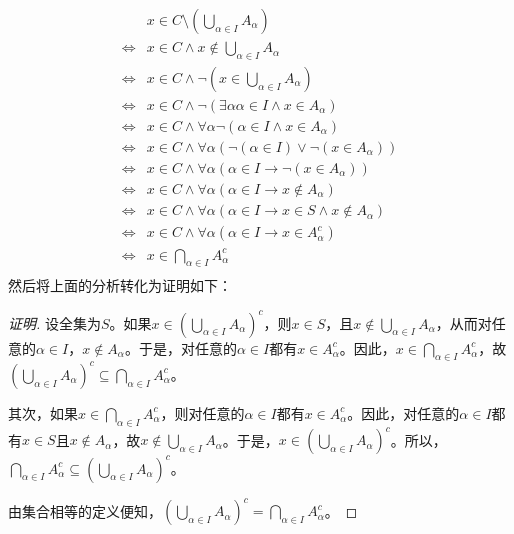 \documentclass{book}[oneside]
\begin{document}
\begin{CJK*}{UTF8}{gbsn}
  \begin{equation*}
    \begin{split}
      &x \in C\setminus (\bigcup_{\alpha \in I}A_{\alpha})\\
      \Leftrightarrow &x \in C \land x \notin \bigcup_{\alpha \in I}A_{\alpha}\\
      \Leftrightarrow &x \in C \land \lnot (x \in \bigcup_{\alpha \in I}A_{\alpha})\\
      \Leftrightarrow &x \in C \land \lnot (\exists \alpha \alpha \in I \land x \in A_{\alpha})\\
      \Leftrightarrow &x \in C \land \forall \alpha \lnot (\alpha \in I \land x \in A_{\alpha})\\
      \Leftrightarrow &x \in C \land \forall \alpha (\lnot (\alpha \in I) \lor \lnot (x \in A_{\alpha}))\\
      \Leftrightarrow &x \in C \land \forall \alpha (\alpha \in I \to \lnot (x \in A_{\alpha}))\\
      \Leftrightarrow &x \in C \land \forall \alpha (\alpha \in I \to x \notin A_{\alpha})\\
      \Leftrightarrow &x \in C \land \forall \alpha (\alpha \in I \to x\in S \land x \notin A_{\alpha})\\
            \Leftrightarrow &x \in C \land \forall \alpha (\alpha \in I \to x\in A_{\alpha}^c)\\
      \Leftrightarrow &x \in \bigcap_{\alpha \in I} A_{\alpha}^c \\
    \end{split}
  \end{equation*}
  然后将上面的分析转化为证明如下：  
  \begin{proof}[证明]
    设全集为$S$。如果$x \in (\bigcup_{\alpha \in I}A_{\alpha})^c$，则$x\in S$，且$x \notin \bigcup_{\alpha \in I}A_{\alpha}$，从而对任意的$\alpha \in I$，$x\notin A_{\alpha}$。于是，对任意的$\alpha \in I$都有$x\in A_{\alpha}^c$。因此，$x \in \bigcap_{\alpha \in I} A_{\alpha}^c$，故$(\bigcup_{\alpha \in I}A_{\alpha})^c\subseteq \bigcap_{\alpha\in I}A_{\alpha}^c$。

    其次，如果$x\in \bigcap_{\alpha\in I}A_{\alpha}^c$，则对任意的$\alpha \in I$都有$x\in A_{\alpha}^c$。因此，对任意的$\alpha \in I$都有$x\in S$且$x\notin A_{\alpha}$，故$x\notin \bigcup_{\alpha \in I}A_{\alpha}$。于是，$x \in (\bigcup_{\alpha \in I}A_{\alpha})^c$。所以，$\bigcap_{\alpha\in I}A_{\alpha}^c\subseteq (\bigcup_{\alpha \in I}A_{\alpha})^c$。

    由集合相等的定义便知，$(\bigcup_{\alpha \in I}A_{\alpha})^c=\bigcap_{\alpha\in I}A_{\alpha}^c$。
  \end{proof}
  

\end{CJK*}
\end{document}
